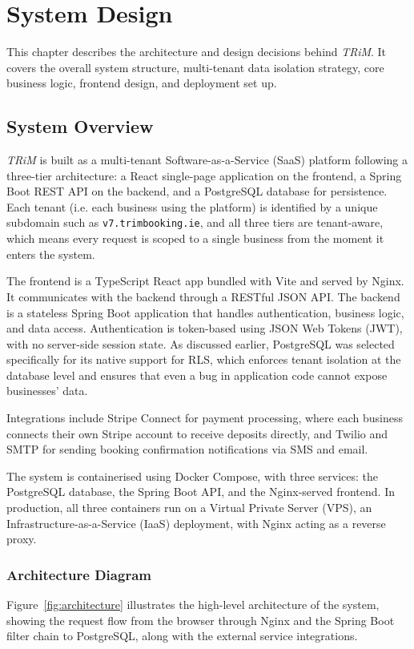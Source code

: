 \chapter{System Design}

This chapter describes the architecture and design decisions behind \textit{TRiM}. It covers the overall system structure, multi-tenant data isolation strategy, core business logic, frontend design, and deployment set up.

\section{System Overview}
\textit{TRiM} is built as a multi-tenant Software-as-a-Service (SaaS) platform following a three-tier architecture: a React single-page application on the frontend, a Spring Boot REST API on the backend, and a PostgreSQL database for persistence. Each tenant (i.e. each business using the platform) is identified by a unique subdomain such as \texttt{v7.trimbooking.ie}, and all three tiers are tenant-aware, which means every request is scoped to a single business from the moment it enters the system.

The frontend is a TypeScript React app bundled with Vite and served by Nginx. It communicates with the backend through a RESTful JSON API. The backend is a stateless Spring Boot application that handles authentication, business logic, and data access. Authentication is token-based using JSON Web Tokens (JWT), with no server-side session state. As discussed earlier, PostgreSQL was selected specifically for its native support for RLS, which enforces tenant isolation at the database level and ensures that even a bug in application code cannot expose businesses' data.

Integrations include Stripe Connect for payment processing, where each business connects their own Stripe account to receive deposits directly, and Twilio and SMTP for sending booking confirmation notifications via SMS and email.

The system is containerised using Docker Compose, with three services: the PostgreSQL database, the Spring Boot API, and the Nginx-served frontend. In production, all three containers run on a Virtual Private Server (VPS), an Infrastructure-as-a-Service (IaaS) deployment, with Nginx acting as a reverse proxy.

\subsection*{Architecture Diagram}
Figure~\ref{fig:architecture} illustrates the high-level architecture of the system, showing the request flow from the browser through Nginx and the Spring Boot filter chain to PostgreSQL, along with the external service integrations.

